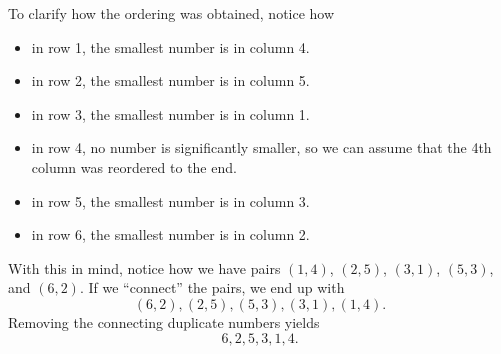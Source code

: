 \documentclass[letterpaper]{article}
\newcommand{\0}{\mathbf{0}}
\begin{document}
\begin{mdframed}
    To clarify how the ordering was obtained, notice how 
    \begin{itemize}
        \item in row 1, the smallest number is in column 4.
        \item in row 2, the smallest number is in column 5.
        \item in row 3, the smallest number is in column 1.
        \item in row 4, no number is significantly smaller, so we can assume that the 4th column was reordered to the end. 
        \item in row 5, the smallest number is in column 3.
        \item in row 6, the smallest number is in column 2.
    \end{itemize}
    With this in mind, notice how we have pairs $(1, 4)$, $(2, 5)$, $(3, 1)$, $(5, 3)$, and $(6, 2)$. If we ``connect'' the pairs, we end up with 
    \[(6, 2), (2, 5), (5, 3), (3, 1), (1, 4).\]
    Removing the connecting duplicate numbers yields 
    \[6, 2, 5, 3, 1, 4.\]
\end{mdframed}
\end{document}
